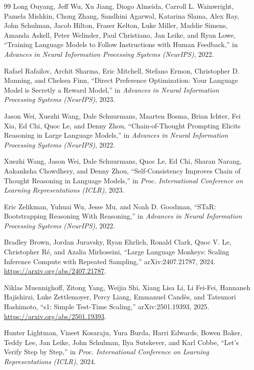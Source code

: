\begin{thebibliography}{99}
 Long Ouyang, Jeff Wu, Xu Jiang, Diogo Almeida, Carroll L. Wainwright, Pamela Mishkin, Chong Zhang, Sandhini Agarwal, Katarina Slama, Alex Ray, John Schulman, Jacob Hilton, Fraser Kelton, Luke Miller, Maddie Simens, Amanda Askell, Peter Welinder, Paul Christiano, Jan Leike, and Ryan Lowe, ``Training Language Models to Follow Instructions with Human Feedback,'' in \emph{Advances in Neural Information Processing Systems (NeurIPS)}, 2022.

 Rafael Rafailov, Archit Sharma, Eric Mitchell, Stefano Ermon, Christopher D. Manning, and Chelsea Finn, ``Direct Preference Optimization: Your Language Model is Secretly a Reward Model,'' in \emph{Advances in Neural Information Processing Systems (NeurIPS)}, 2023.

 Jason Wei, Xuezhi Wang, Dale Schuurmans, Maarten Bosma, Brian Ichter, Fei Xia, Ed Chi, Quoc Le, and Denny Zhou, ``Chain-of-Thought Prompting Elicits Reasoning in Large Language Models,'' in \emph{Advances in Neural Information Processing Systems (NeurIPS)}, 2022.

 Xuezhi Wang, Jason Wei, Dale Schuurmans, Quoc Le, Ed Chi, Sharan Narang, Aakanksha Chowdhery, and Denny Zhou, ``Self-Consistency Improves Chain of Thought Reasoning in Language Models,'' in \emph{Proc. International Conference on Learning Representations (ICLR)}, 2023.

 Eric Zelikman, Yuhuai Wu, Jesse Mu, and Noah D. Goodman, ``STaR: Bootstrapping Reasoning With Reasoning,'' in \emph{Advances in Neural Information Processing Systems (NeurIPS)}, 2022.

 Bradley Brown, Jordan Juravsky, Ryan Ehrlich, Ronald Clark, Quoc V. Le, Christopher Ré, and Azalia Mirhoseini, ``Large Language Monkeys: Scaling Inference Compute with Repeated Sampling,'' arXiv:2407.21787, 2024. \url{https://arxiv.org/abs/2407.21787}.

 Niklas Muennighoff, Zitong Yang, Weijia Shi, Xiang Lisa Li, Li Fei-Fei, Hannaneh Hajishirzi, Luke Zettlemoyer, Percy Liang, Emmanuel Candès, and Tatsunori Hashimoto, ``s1: Simple Test-Time Scaling,'' arXiv:2501.19393, 2025. \url{https://arxiv.org/abs/2501.19393}.

 Hunter Lightman, Vineet Kosaraju, Yura Burda, Harri Edwards, Bowen Baker, Teddy Lee, Jan Leike, John Schulman, Ilya Sutskever, and Karl Cobbe, ``Let's Verify Step by Step,'' in \emph{Proc. International Conference on Learning Representations (ICLR)}, 2024.


\end{thebibliography}
